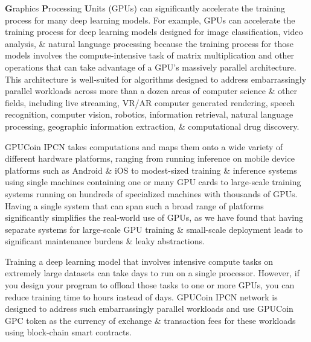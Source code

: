 \textbf{G}raphics \textbf{P}rocessing \textbf{U}nits (GPUs) can significantly accelerate the training process for many deep learning models. For example, GPUs can accelerate the training process for deep learning models designed for image classification, video analysis, \& natural language processing because the training process for those models involves the compute-intensive task of matrix multiplication and other operations that can take advantage of a GPU's massively parallel architecture. This architecture is well-suited for algorithms designed to address embarrassingly parallel workloads across more than a dozen areas of computer science \& other fields, including live streaming, VR/AR computer generated rendering, speech recognition, computer vision, robotics, information retrieval, natural language processing, geographic information extraction, \& computational drug discovery.

GPUCoin IPCN takes computations and maps them onto a wide variety of different hardware platforms, ranging from running inference on mobile device platforms such as Android \& iOS to modest-sized training \& inference systems using single machines containing one or many GPU cards to large-scale training systems running on hundreds of specialized machines with thousands of GPUs. Having a single system that can span such a broad range of platforms significantly simplifies the real-world use of GPUs, as we have found that having separate systems for large-scale GPU training \& small-scale deployment leads to significant maintenance burdens \& leaky abstractions.

Training a deep learning model that involves intensive compute tasks on extremely large datasets can take days to run on a single processor. However, if you design your program to offload those tasks to one or more GPUs, you can reduce training time to hours instead of days. GPUCoin IPCN network is designed to address such embarrassingly parallel workloads and use GPUCoin GPC token as the currency of exchange \& transaction fees for these workloads using block-chain smart contracts. 

